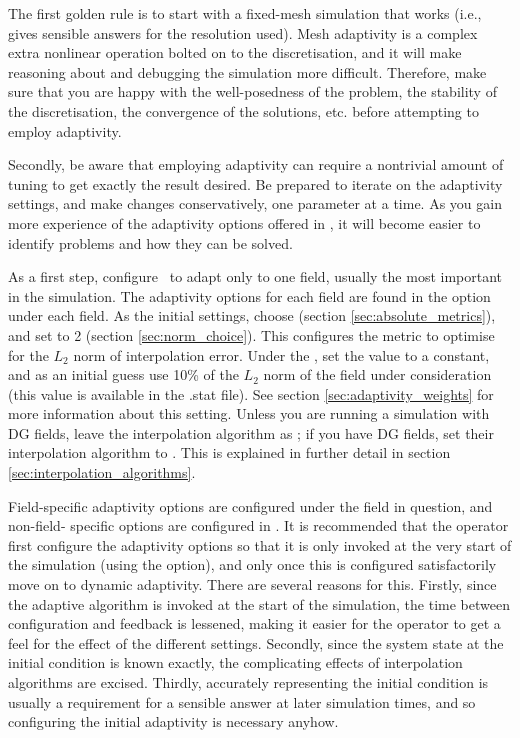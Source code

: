The first golden rule is to start with a fixed-mesh simulation that works
(i.e., gives sensible answers for the resolution used). Mesh adaptivity is a complex
extra nonlinear operation bolted on to the discretisation, and it will make reasoning
about and debugging the simulation more difficult. Therefore, make sure that you
are happy with the well-posedness of the problem, the stability of the discretisation,
the convergence of the solutions, etc. before attempting to employ adaptivity.

Secondly, be aware that employing adaptivity can require a nontrivial amount of tuning
to get exactly the result desired. Be prepared to iterate on the adaptivity settings,
and make changes conservatively, one parameter at a time. As you gain more experience
of the adaptivity options offered in \fluidity, it will become easier to identify
problems and how they can be solved.

As a first step, configure \fluidity\ to adapt only to one field, usually the most
important in the simulation. The adaptivity options for each field are found in the
 option under each field. As the initial settings,
choose  (section \ref{sec:absolute_metrics}), and set 
to 2 (section \ref{sec:norm_choice}). This configures the metric to optimise for the $L_2$ norm
of interpolation error. Under the , set the value to a constant,
and as an initial guess use 10\% of the $L_2$ norm of the field under consideration (this
value is available in the .stat file). See section \ref{sec:adaptivity_weights} for more information
about this setting. Unless you are running a simulation with DG fields, leave the interpolation
algorithm as ; if you have DG fields, set their interpolation
algorithm to . This is explained in further detail in section \ref{sec:interpolation_algorithms}.

Field-specific adaptivity options are configured under the field in question, and non-field-
specific options are configured in . It is recommended
that the operator first configure the adaptivity options so that it is only invoked at the
very start of the simulation (using the  option), and only once this is configured satisfactorily move on to dynamic adaptivity. There are several reasons for this. Firstly, since the adaptive algorithm is invoked
at the start of the simulation, the time between configuration and feedback is lessened, making it
easier for the operator to get a feel for the effect of the different settings. Secondly, since the
system state at the initial condition is known exactly, the complicating effects of interpolation
algorithms are excised. Thirdly, accurately representing the initial condition is usually a requirement
for a sensible answer at later simulation times, and so configuring the initial adaptivity is
necessary anyhow.

